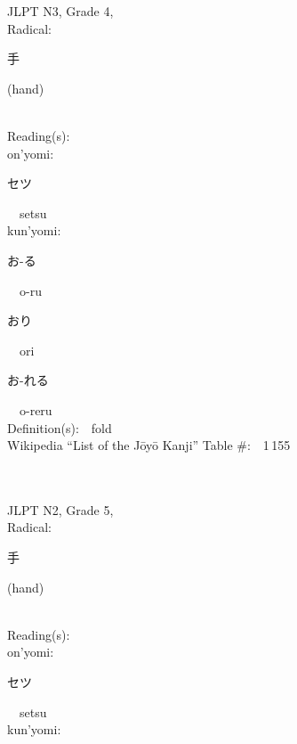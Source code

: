 \begin{multicols}{2}
{JLPT N3, Grade 4, \\Radical:\ \ {\begin{CJK}{UTF8}{min} 手 \end{CJK}} (hand) } \\
Reading(s):\ \ \\
{\hspace*{1em}}on'yomi:\ \ \\
{\hspace*{2em}}{\begin{CJK}{UTF8}{min} セツ \end{CJK}}\ \ setsu\ \ \\
{\hspace*{1em}}kun'yomi:\ \ \\
{\hspace*{2em}}{\begin{CJK}{UTF8}{min} お-る \end{CJK}}\ \ o-ru\ \ \\
{\hspace*{2em}}{\begin{CJK}{UTF8}{min} おり \end{CJK}}\ \ ori\ \ \\
{\hspace*{2em}}{\begin{CJK}{UTF8}{min} お-れる \end{CJK}}\ \ o-reru\ \ \\
Definition(s):\ \ fold \\
Wikipedia ``List of the J\=oy\=o Kanji'' Table \#:\ \ 1\,155 \\
\ \ \\
{\fontsize{34pt}{40pt}  }\ \ \\  %
{JLPT N2, Grade 5, \\Radical:\ \ {\begin{CJK}{UTF8}{min} 手 \end{CJK}} (hand) } \\
Reading(s):\ \ \\
{\hspace*{1em}}on'yomi:\ \ \\
{\hspace*{2em}}{\begin{CJK}{UTF8}{min} セツ \end{CJK}}\ \ setsu\ \ \\
{\hspace*{1em}}kun'yomi:\ \ \\

\end{multicols}
